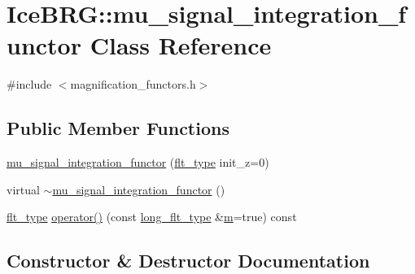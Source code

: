 \hypertarget{classIceBRG_1_1mu__signal__integration__functor}{}\section{Ice\+B\+R\+G\+:\+:mu\+\_\+signal\+\_\+integration\+\_\+functor Class Reference}
\label{classIceBRG_1_1mu__signal__integration__functor}


{\ttfamily \#include $<$magnification\+\_\+functors.\+h$>$}

\subsection*{Public Member Functions}
\begin{DoxyCompactItemize}
\item 
\hyperlink{classIceBRG_1_1mu__signal__integration__functor_adcf7391f693e91147be3556c3d7a0cd0}{mu\+\_\+signal\+\_\+integration\+\_\+functor} (\hyperlink{lib_2IceBRG__main_2common_8h_ad0f130a56eeb944d9ef2692ee881ecc4}{flt\+\_\+type} init\+\_\+z=0)
\item 
virtual \hyperlink{classIceBRG_1_1mu__signal__integration__functor_ab688531f79c3c3f8e3946e6bff1079ed}{$\sim$mu\+\_\+signal\+\_\+integration\+\_\+functor} ()
\item 
\hyperlink{lib_2IceBRG__main_2common_8h_ad0f130a56eeb944d9ef2692ee881ecc4}{flt\+\_\+type} \hyperlink{classIceBRG_1_1mu__signal__integration__functor_ad30a82f71d64b7d7141e6a3ffc2e6377}{operator()} (const \hyperlink{lib_2IceBRG__main_2common_8h_a7040956e7e1b504d34a9ccfb4253bdce}{long\+\_\+flt\+\_\+type} \&\hyperlink{namespaceIceBRG_ada6365c5d16106f0608afbd34f010bcc}{m}=true) const 
\end{DoxyCompactItemize}


\subsection{Constructor \& Destructor Documentation}
\hypertarget{classIceBRG_1_1mu__signal__integration__functor_adcf7391f693e91147be3556c3d7a0cd0}{}
